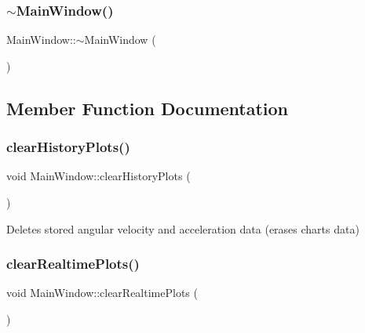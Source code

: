 \mbox{\label{class_main_window_ae98d00a93bc118200eeef9f9bba1dba7}} 
\subsubsection{$\sim$\+Main\+Window()}
{\footnotesize\ttfamily Main\+Window\+::$\sim$\+Main\+Window (\begin{DoxyParamCaption}{ }\end{DoxyParamCaption})}



\subsection{Member Function Documentation}
\mbox{\label{class_main_window_ab7febfbc2493e928eea3beba33b4b6bb}} 
\subsubsection{clear\+History\+Plots()}
{\footnotesize\ttfamily void Main\+Window\+::clear\+History\+Plots (\begin{DoxyParamCaption}{ }\end{DoxyParamCaption})\hspace{0.3cm}{\ttfamily [private]}}



Deletes stored angular velocity and acceleration data (erases charts data) 

\mbox{\label{class_main_window_ae9a461c9fd369552f0e8871ec8f8f191}} 
\subsubsection{clear\+Realtime\+Plots()}
{\footnotesize\ttfamily void Main\+Window\+::clear\+Realtime\+Plots (\begin{DoxyParamCaption}{ }\end{DoxyParamCaption})\hspace{0.3cm}{\ttfamily [private]}}



